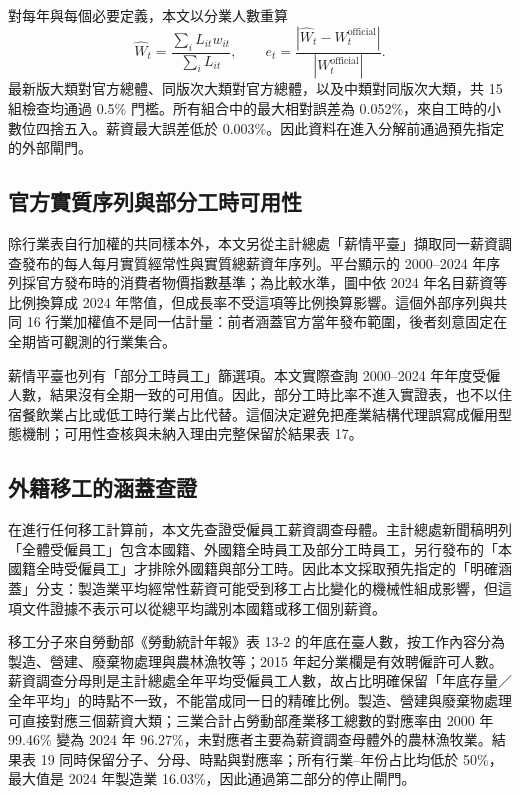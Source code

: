 \documentclass[12pt]{article}
\begin{document}
對每年與每個必要定義，本文以分業人數重算
\[
\widehat W_t=\frac{\sum_i L_{it}w_{it}}{\sum_i L_{it}},
\qquad
e_t=\frac{|\widehat W_t-W_t^{\mathrm{official}}|}{|W_t^{\mathrm{official}}|}.
\]
最新版大類對官方總體、同版次大類對官方總體，以及中類對同版次大類，共 15 組檢查均通過 0.5\% 門檻。所有組合中的最大相對誤差為 0.052\%，來自工時的小數位四捨五入。薪資最大誤差低於 0.003\%。因此資料在進入分解前通過預先指定的外部閘門。

\subsection{官方實質序列與部分工時可用性}

除行業表自行加權的共同樣本外，本文另從主計總處「薪情平臺」擷取同一薪資調查發布的每人每月實質經常性與實質總薪資年序列\citep{dgbas-platform}。平台顯示的 2000--2024 年序列採官方發布時的消費者物價指數基準；為比較水準，圖中依 2024 年名目薪資等比例換算成 2024 年幣值，但成長率不受這項等比例換算影響。這個外部序列與共同 16 行業加權值不是同一估計量：前者涵蓋官方當年發布範圍，後者刻意固定在全期皆可觀測的行業集合。

薪情平臺也列有「部分工時員工」篩選項。本文實際查詢 2000--2024 年年度受僱人數，結果沒有全期一致的可用值。因此，部分工時比率不進入實證表，也不以住宿餐飲業占比或低工時行業占比代替。這個決定避免把產業結構代理誤寫成僱用型態機制；可用性查核與未納入理由完整保留於結果表 17。

\subsection{外籍移工的涵蓋查證}

在進行任何移工計算前，本文先查證受僱員工薪資調查母體。主計總處新聞稿明列「全體受僱員工」包含本國籍、外國籍全時員工及部分工時員工，另行發布的「本國籍全時受僱員工」才排除外國籍與部分工時\citep{dgbas-employee-scope}。因此本文採取預先指定的「明確涵蓋」分支：製造業平均經常性薪資可能受到移工占比變化的機械性組成影響，但這項文件證據不表示可以從總平均識別本國籍或移工個別薪資。

移工分子來自勞動部《勞動統計年報》表 13-2 的年底在臺人數，按工作內容分為製造、營建、廢棄物處理與農林漁牧等；2015 年起分業欄是有效聘僱許可人數\citep{mol-yearbook}。薪資調查分母則是主計總處全年平均受僱員工人數，故占比明確保留「年底存量／全年平均」的時點不一致，不能當成同一日的精確比例。製造、營建與廢棄物處理可直接對應三個薪資大類；三業合計占勞動部產業移工總數的對應率由 2000 年 99.46\% 變為 2024 年 96.27\%，未對應者主要為薪資調查母體外的農林漁牧業。結果表 19 同時保留分子、分母、時點與對應率；所有行業--年份占比均低於 50\%，最大值是 2024 年製造業 16.03\%，因此通過第二部分的停止閘門。
\end{document}
